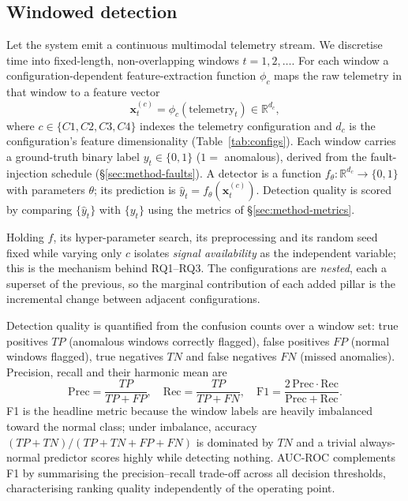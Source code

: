 \documentclass[acmsmall]{acmart}
\begin{document}
\subsection{Windowed detection}\label{sec:prob-detect}

Let the system emit a continuous multimodal telemetry stream. We discretise time into fixed-length, non-overlapping windows $t = 1, 2, \dots$. For each window a configuration-dependent feature-extraction function $\phi_c$ maps the raw telemetry in that window to a feature vector
\begin{equation}
  \mathbf{x}_t^{(c)} = \phi_c(\text{telemetry}_t) \in \mathbb{R}^{d_c},
\end{equation}
where $c \in \{C1, C2, C3, C4\}$ indexes the telemetry configuration and $d_c$ is the configuration's feature dimensionality (Table~\ref{tab:configs}). Each window carries a ground-truth binary label $y_t \in \{0,1\}$ ($1 =$ anomalous), derived from the fault-injection schedule (\S\ref{sec:method-faults}). A detector is a function $f_\theta : \mathbb{R}^{d_c} \to \{0,1\}$ with parameters $\theta$; its prediction is $\hat{y}_t = f_\theta(\mathbf{x}_t^{(c)})$. Detection quality is scored by comparing $\{\hat{y}_t\}$ with $\{y_t\}$ using the metrics of \S\ref{sec:method-metrics}.

Holding $f$, its hyper-parameter search, its preprocessing and its random seed fixed while varying only $c$ isolates \emph{signal availability} as the independent variable; this is the mechanism behind RQ1--RQ3. The configurations are \emph{nested}, each a superset of the previous, so the marginal contribution of each added pillar is the incremental change between adjacent configurations.

Detection quality is quantified from the confusion counts over a window set: true positives $TP$ (anomalous windows correctly flagged), false positives $FP$ (normal windows flagged), true negatives $TN$ and false negatives $FN$ (missed anomalies). Precision, recall and their harmonic mean are
\begin{equation}
  \mathrm{Prec} = \frac{TP}{TP+FP}, \quad
  \mathrm{Rec} = \frac{TP}{TP+FN}, \quad
  \mathrm{F1} = \frac{2\,\mathrm{Prec}\cdot\mathrm{Rec}}{\mathrm{Prec}+\mathrm{Rec}}.
\end{equation}
F1 is the headline metric because the window labels are heavily imbalanced toward the normal class; under imbalance, accuracy $(TP{+}TN)/(TP{+}TN{+}FP{+}FN)$ is dominated by $TN$ and a trivial always-normal predictor scores highly while detecting nothing. AUC-ROC complements F1 by summarising the precision--recall trade-off across all decision thresholds, characterising ranking quality independently of the operating point.
\end{document}
